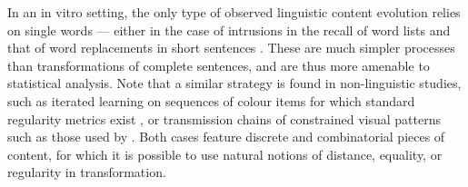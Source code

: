 In an in vitro setting, the only type of observed linguistic content evolution relies on single words –-- either in the case of intrusions in the recall of word lists \autocite[see][for a review]{zaromb_temporal_2006} and that of word replacements in short sentences \autocites{potter_regeneration_1990}{lombardi_regeneration_1992}.
These are much simpler processes than transformations of complete sentences, and are thus more amenable to statistical analysis. Note that a similar strategy is found in non-linguistic studies, such as iterated learning on sequences of colour items for which standard regularity metrics exist \autocite{cornish_systems_2013}, or transmission chains of constrained visual patterns such as those used by \textcite{claidiere_cultural_2014}. Both cases feature discrete and combinatorial pieces of content, for which it is possible to use natural notions of distance, equality, or regularity in transformation. 






